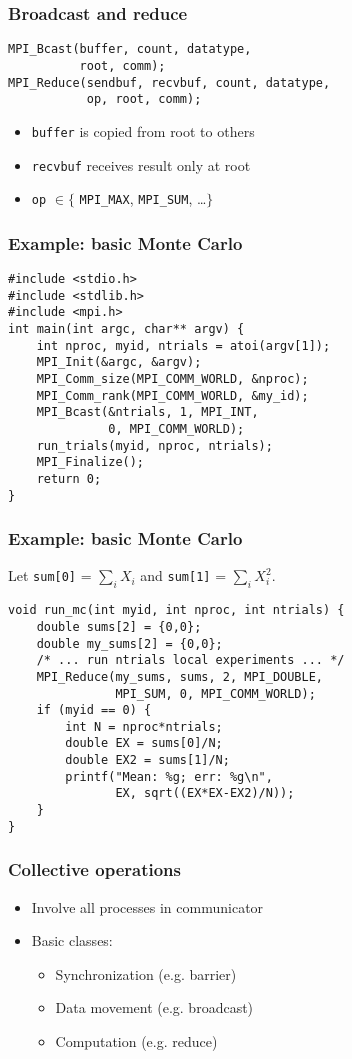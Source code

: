 \documentclass{beamer}
\begin{document}
\begin{frame}[fragile]
  \frametitle{Broadcast and reduce}

\begin{verbatim}
MPI_Bcast(buffer, count, datatype,
          root, comm);
MPI_Reduce(sendbuf, recvbuf, count, datatype,
           op, root, comm);
\end{verbatim}

\begin{itemize}
\item {\tt buffer} is copied from root to others
\item {\tt recvbuf} receives result only at root
\item {\tt op} $\in \{$ {\tt MPI\_MAX}, {\tt MPI\_SUM}, \ldots $\}$
\end{itemize}
\end{frame}

\begin{frame}[fragile]
  \frametitle{Example: basic Monte Carlo}

\begin{verbatim}
#include <stdio.h>
#include <stdlib.h>
#include <mpi.h>
int main(int argc, char** argv) {
    int nproc, myid, ntrials = atoi(argv[1]);
    MPI_Init(&argc, &argv);
    MPI_Comm_size(MPI_COMM_WORLD, &nproc);
    MPI_Comm_rank(MPI_COMM_WORLD, &my_id);
    MPI_Bcast(&ntrials, 1, MPI_INT, 
              0, MPI_COMM_WORLD);
    run_trials(myid, nproc, ntrials);
    MPI_Finalize();
    return 0;
}
\end{verbatim}
\end{frame}


\begin{frame}[fragile]
  \frametitle{Example: basic Monte Carlo}

Let {\tt sum[0]} = $\sum_i X_i$ and {\tt sum[1]} = $\sum_i X_i^2$.
\begin{verbatim}
void run_mc(int myid, int nproc, int ntrials) {
    double sums[2] = {0,0};
    double my_sums[2] = {0,0};
    /* ... run ntrials local experiments ... */
    MPI_Reduce(my_sums, sums, 2, MPI_DOUBLE, 
               MPI_SUM, 0, MPI_COMM_WORLD);
    if (myid == 0) {
        int N = nproc*ntrials;
        double EX = sums[0]/N;
        double EX2 = sums[1]/N;
        printf("Mean: %g; err: %g\n", 
               EX, sqrt((EX*EX-EX2)/N));
    }
}
\end{verbatim}
\end{frame}


\begin{frame}
  \frametitle{Collective operations}

  \begin{itemize}
  \item Involve all processes in communicator
  \item Basic classes:
    \begin{itemize}
    \item Synchronization (e.g. barrier)
    \item Data movement (e.g. broadcast)
    \item Computation (e.g. reduce)
    \end{itemize}
  \end{itemize}
\end{frame}
\end{document}
